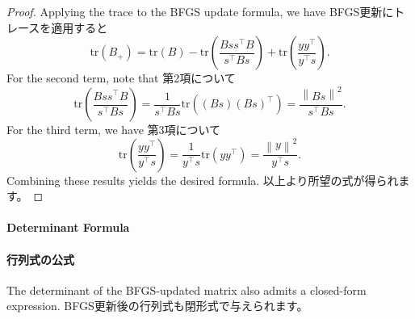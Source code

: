 \documentclass[0_main]{subfiles}
\begin{document}
\begin{proof}
    \ifEn
        Applying the trace to the BFGS update formula, we have
    \else
        BFGS更新にトレースを適用すると
    \fi
    \begin{equation*}
        \mathrm{tr}(B_{+}) = \mathrm{tr}(B) - \mathrm{tr}\left(\frac{Bss^\top B}{s^\top Bs}\right) + \mathrm{tr}\left(\frac{yy^\top}{y^\top s}\right).
    \end{equation*}
    \ifEn
        For the second term, note that
    \else
        第2項について
    \fi
    \begin{equation*}
        \mathrm{tr}\left(\frac{Bss^\top B}{s^\top Bs}\right) = \frac{1}{s^\top Bs}\mathrm{tr}((Bs)(Bs)^\top) = \frac{\left\lVert B s \right\rVert^2}{s^\top Bs}.
    \end{equation*}
    \ifEn
        For the third term, we have
    \else
        第3項について
    \fi
    \begin{equation*}
        \mathrm{tr}\left(\frac{yy^\top}{y^\top s}\right) = \frac{1}{y^\top s}\mathrm{tr}(yy^\top) = \frac{\left\lVert y \right\rVert^2}{y^\top s}.
    \end{equation*}
    \ifEn
        Combining these results yields the desired formula.
    \else
        以上より所望の式が得られます。
    \fi
    \myQED
\end{proof}

\ifEn
    \paragraph{Determinant Formula}
\else
    \paragraph{行列式の公式}
\fi

\ifEn
    The determinant of the BFGS-updated matrix also admits a closed-form expression.
\else
    BFGS更新後の行列式も閉形式で与えられます。
\fi
\end{document}

